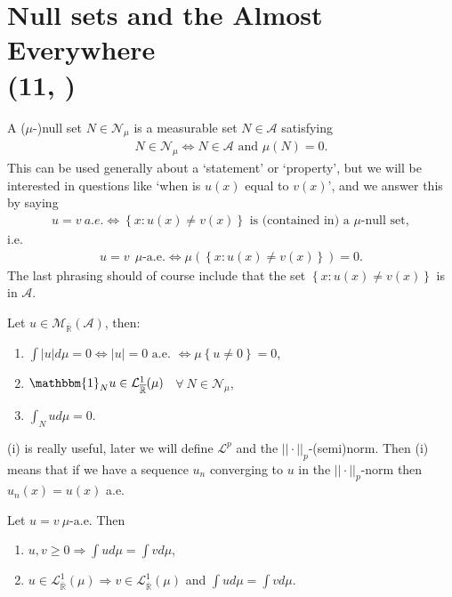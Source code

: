 \section{Null sets and the Almost Everywhere \protect\\ \tiny{(11, \cite{schilling2017measures})}}
\begin{definition}
    A (\(\mu\)-)null set \(N\in\mathcal{N}_{\mu}\) is a measurable set \(N\in\mathscr{A}\) satisfying
    \begin{align*}
        N\in\mathcal{N}_{\mu} \Longleftrightarrow N\in\mathscr{A} \text{ and } \mu(N) = 0.
    \end{align*}
    This can be used generally about a `statement' or `property', but we will be interested in questions like 
    `when is \(u(x)\) equal to \(v(x)\)', and we answer this by saying
    \begin{align*}
        u=v \ a.e. \Leftrightarrow \left\{ x: u(x) \neq v(x) \right\} \text{ is (contained in) a }\mu\text{-null set}, 
    \end{align*}
    i.e.
    \begin{align*}
        u=v \ \  \mu\text{-a.e.} \Leftrightarrow \mu\left( \left\{ x: u(x) \neq v(x) \right\} \right) = 0.
    \end{align*}
    The last phrasing should of course include that the set \( \left\{ x: u(x) \neq v(x) \right\}\) is in \(\mathscr{A}\).
\end{definition}
\begin{theorem} \label{th:11.2}
    Let \(u\in \mathcal{M}_{\overline{\mathbb{R}}}(\mathscr{A})\), then:
    \begin{enumerate}[label=(\roman*)]
        \item \(\int\vert u\vert d\mu = 0 \Leftrightarrow \vert u\vert = 0 \text{ a.e. } \Leftrightarrow \mu\left\{u\neq0\right\} = 0\),
        \item \(\mathbbm{1}_{N}u\in \mathcal{L}^{1}_{\overline{\mathbb{R}}}(\mu)\) \ \(\forall \ N\in\mathcal{N}_{\mu}\),
        \item \(\int_Nud\mu = 0\).
    \end{enumerate}
    (i) is really useful, later we will define \(\mathcal{L}^p\) and the \(||\cdot||_p\)-(semi)norm. Then (i) means that if we have a
    sequence \(u_n\) converging to \(u\) in the \(||\cdot ||_p\)-norm then \(u_n(x) = u(x)\) a.e.
\end{theorem}
\begin{corollary}
    Let \(u=v \ \mu \text{-a.e.}\) Then
    \begin{enumerate}[label=(\roman*)]
        \item \(u,v \geq 0 \Rightarrow \int ud\mu = \int vd\mu\),
        \item \(u\in\mathcal{L}^{1}_{\overline{\mathbb{R}}}(\mu) \Rightarrow v\in\mathcal{L}^{1}_{\overline{\mathbb{R}}}(\mu)\) and \(\int ud\mu = \int vd\mu\).
    \end{enumerate}
\end{corollary}
